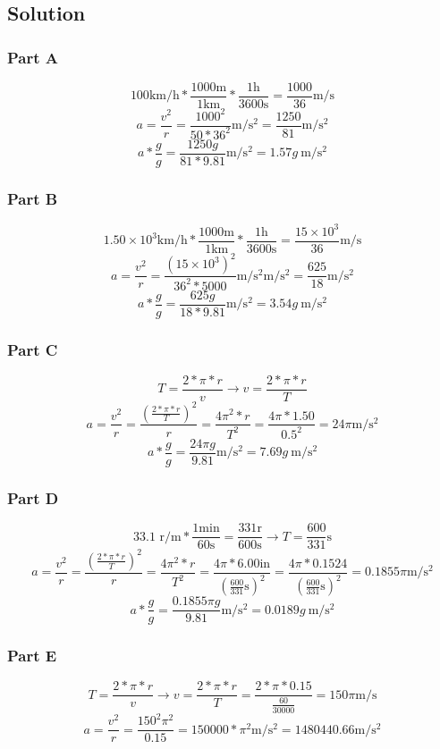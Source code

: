 \documentclass[12pt]{article}
\begin{document}
\subsection*{Solution}
\subsubsection*{Part A}
\[ 100 \unit{\kilo\meter/\hour} * \frac{1000\unit{\meter}}{1\unit{\kilo\meter}} * \frac{1\unit{\hour}}{3600\unit{\second}} = \frac{1000}{36}\unit{\meter/\second} \]
\[ a = \frac{v^2}{r} = \frac{1000^2}{50*36^2} \unit{\meter/\second^2} = \frac{1250}{81} \unit{\meter/\second^2} \]
\[ a*\frac{g}{g} = \frac{1250g}{81*9.81} \unit{\meter/\second^2} = \boxed{1.57g\ \unit{\meter/\second^2}}\]

\subsubsection*{Part B}
\[ 1.50\times10^3 \unit{\kilo\meter/\hour} * \frac{1000\unit{\meter}}{1\unit{\kilo\meter}} * \frac{1\unit{\hour}}{3600\unit{\second}} = \frac{15\times10^3}{36}\unit{\meter/\second} \]
\[ a = \frac{v^2}{r} = \frac{(15\times10^3)^2}{36^2*5000}\unit{\meter/\second^2} \unit{\meter/\second^2} = \frac{625}{18} \unit{\meter/\second^2} \]
\[ a*\frac{g}{g} = \frac{625g}{18*9.81} \unit{\meter/\second^2} = \boxed{3.54g\ \unit{\meter/\second^2}}\]

\subsubsection*{Part C}
\[ T = \frac{2*\pi*r}{v} \rightarrow v = \frac{2*\pi*r}{T} \]
\[ a = \frac{v^2}{r} = \frac{\left(\frac{2*\pi*r}{T}\right)^2}{r} = \frac{4\pi^2*r}{T^2} = \frac{4\pi*1.50}{0.5^2} = 24\pi \unit{\meter/\second^2} \]
\[ a*\frac{g}{g} = \frac{24\pi g}{9.81} \unit{\meter/\second^2} = \boxed{7.69g\ \unit{\meter/\second^2}}\]

\pagebreak
\subsubsection*{Part D}
\[ 33.1 \text{ r/m} * \frac{1\unit{\minute}}{60\unit{\second}} = \frac{331 \text{r}}{600 \unit{\second}} \rightarrow T = \frac{600}{331} \unit{\second} \]
\[ a = \frac{v^2}{r} = \frac{\left(\frac{2*\pi*r}{T}\right)^2}{r} = \frac{4\pi^2*r}{T^2} = \frac{4\pi*6.00\text{in}}{\left(\frac{600}{331} \unit{\second}\right)^2} = \frac{4\pi*0.1524}{\left(\frac{600}{331} \unit{\second}\right)^2} = 0.1855\pi \unit{\meter/\second^2} \]
\[ a*\frac{g}{g} = \frac{0.1855\pi g}{9.81} \unit{\meter/\second^2} = \boxed{0.0189g\ \unit{\meter/\second^2}}\]

\subsubsection*{Part E}
\[ T = \frac{2*\pi*r}{v} \rightarrow v = \frac{2*\pi*r}{T} = \frac{2*\pi*0.15}{\frac{60}{30000}} = 150\pi \unit{\meter/\second}\]
\[ a = \frac{v^2}{r} = \frac{150^2\pi^2}{0.15} = 150000*\pi^2 \unit{\meter/\second^2} = \boxed{1480440.66 \unit{\meter/\second^2}} \]
\end{document}

